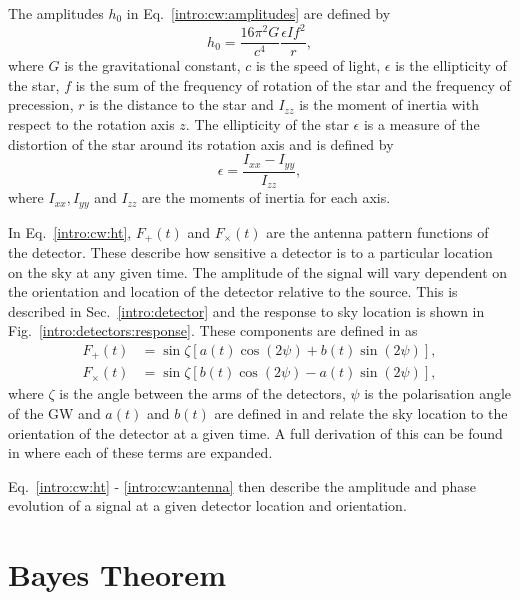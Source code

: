 The amplitudes $h_0$ in Eq.~\ref{intro:cw:amplitudes} are defined by
\begin{equation}
    h_0 = \frac{16 \pi^2 G}{c^4} \frac{\epsilon I f^2}{r},
\end{equation}
where $G$ is the gravitational constant, $c$ is the speed of light, $\epsilon$ is the ellipticity of the star, $f$ is the sum of the frequency of rotation of the star and the frequency of precession, $r$ is the distance to the star and $I_{zz}$ is the moment of inertia with respect to the rotation axis $z$.
The ellipticity of the star $\epsilon$ is a measure of the distortion of the star around its rotation axis and is defined by
\begin{equation}
    \epsilon = \frac{I_{xx} - I_{yy}}{I_{zz}},
\end{equation}
where $I_{xx}, I_{yy}$ and $I_{zz}$ are the moments of inertia for each axis.

In Eq.~\ref{intro:cw:ht}, $F_+(t)$ and $F_{\times}(t)$ are the antenna pattern functions of the detector. 
These describe how sensitive a detector is to a particular location on the sky at any given time. 
The amplitude of the signal will vary dependent on the orientation and location of the detector relative to the source.
This is described in Sec.~\ref{intro:detector} and the response to sky location is shown in Fig.~\ref{intro:detectors:response}.
These components are defined in \citep{schutz1998DataAnalysis} as
\begin{equation}
\label{intro:cw:antenna}
\begin{split}
F_{+}(t) &= \sin{\zeta}[a(t)\cos{(2\psi)} + b(t)\sin{(2\psi)}], \\
F_{\times}(t) &= \sin{\zeta}[b(t) \cos{(2\psi)} - a(t)\sin{(2\psi)}],
\end{split}
\end{equation}
where $\zeta$ is the angle between the arms of the detectors, $\psi$ is the polarisation angle of the \gls{GW} and $a(t)$ and $b(t)$ are defined in \citep{schutz1998DataAnalysis} and relate the sky location to the orientation of the detector at a given time. 
A full derivation of this can be found in \citep{schutz1998DataAnalysis} where each of these terms are expanded.

Eq.~\ref{intro:cw:ht} - \ref{intro:cw:antenna} then describe the amplitude and phase evolution of a signal at a given detector location and orientation.



\section{\label{intro:prob} Bayes Theorem}

